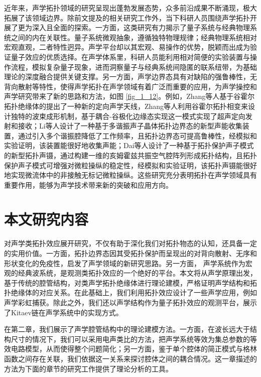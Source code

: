 近年来，声学拓扑领域的研究呈现出蓬勃发展态势，众多前沿成果不断涌现，极大拓展了该领域边界。除前文提及的相关研究工作外，当下科研人员围绕声学拓扑开展了更为深入且全面的探索\cite{j1,j2,j3,j4,j5,j6,j7,j8,j9,j10,j11,j12,j13,j14,j15,j16,j17,j18,j19,j20,j21,j22,j23,j24,j25,j26,j27,j28,j29,j30,j31}。一方面，这类研究有力揭示了量子系统与经典物理系统之间的内在关联性。量子系统微观抽象，遵循独特物理规律；经典物理系统相对宏观直观，二者特性迥异。声学平台却以其宏观、易操作的优势，脱颖而出成为验证量子效应的优质选择。在声学体系里，科研人员能利用相对简便的实验装置与操作流程，模拟复杂量子现象，进而洞察量子与经典系统间隐匿的联系纽带，为基础理论的深度融合提供关键支撑。另一方面，声学边界态具有对缺陷的强鲁棒性，无背向散射等特性，使得声学拓扑在声学领域有着广泛而重要的应用，为声学操控和声学研究带来了新的思路和方法，如图 \ref{fig_1_12}。例如，Zhang等人基于谷霍尔拓扑绝缘体的提出了一种新的定向声学天线，Zhang等人利用谷霍尔拓扑相变来设计独特的波束成形机制，基于耦合-谷极化边缘态实现这一模式实现了超声定向发射和接收\cite{j2}；Li等人设计了一种基于多谐振声子晶体拓扑边界态的新型声能收集装置，通过引入多个谐振腔降低了工作频率，且拓扑边界态可提高鲁棒性，经模拟和实验证明，该装置能很好地收集声能\cite{j17}；Dai等人设计了一种基于拓扑保护声子模式的新型拓扑声镊，通过构建一维的亥姆霍兹共振空气腔阵列形成拓扑结构，且拓扑保护声子模式可增强对微粒操纵的稳定性，经模拟和实验证明，该拓扑声镊能很好地实现微流体中的非接触无标记微粒操纵\cite{j13}。这些研究充分表明拓扑在声学领域具有重要作用，能够为声学技术带来新的突破和应用方向。

\section{本文研究内容}

对声学类拓扑效应展开研究，不仅有助于深化我们对拓扑物态的认知，还具备一定的实用价值。一方面，拓扑边界态因其受拓扑保护而呈现出的对背向散射、无序和形状变化的免疫性，启发了声学领域的新研究思路。另一方面， 声学系统作为宏观的经典波系统，是观测类拓扑效应的一个绝好的平台。本文将从声学原理出发，基于传统的腔管结构，对类声学拓扑绝缘体进行理论建模，严格证明声学结构和拓扑绝缘体的对应关系。在此基础上，我们利用拓扑效应设计了一些声学应用，例如声学彩虹捕获。除此之外，我们还以声学结构作为量子拓扑效应的观测平台，展示了Kitaev链在声学系统中的实现方式。

在第二章，我们展示了声学腔管结构中的理论建模方法。一方面，在波长远大于结构尺寸的情况下，我们可以采用电声类比的方法，把声学系统等效为集总参数的等效电路模型，从而使得整个问题简化；另一方面，鉴于单个腔体的简正模式与格林函数之间存在关联，我们依据这一关系来探讨腔体之间的耦合情况。这一章描述的方法为下面的章节的研究工作提供了理论分析的工具。


